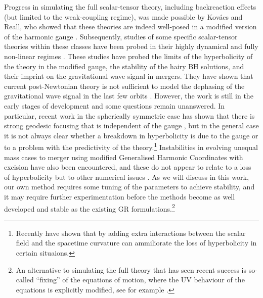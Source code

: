 \documentclass[reprint,aps,amsmath,amssymb,twoside,prd,showkeys,superscriptaddress,nofootinbib]{revtex4-2}
\begin{document}
Progress in simulating the full scalar-tensor theory, including backreaction effects (but limited to the weak-coupling regime), was made possible by Kov\'acs and Reall, who showed that these theories are indeed well-posed in a modified version of the harmonic gauge \cite{Kovacs:2020pns,Kovacs:2020ywu}. Subsequently, studies of some specific scalar-tensor theories within these classes have been probed in their highly dynamical and fully non-linear regimes \cite{East:2020hgw,East:2021bqk,East:2022rqi,Corman:2022xqg}. These studies have probed the limits of the hyperbolicity of the theory in the modified gauge, the stability of the hairy BH solutions, and their imprint on the gravitational wave signal in mergers. They have shown that current post-Newtonian theory is not sufficient to model the dephasing of the gravitational wave signal in the last few orbits \cite{Corman:2022xqg}. However, the work is still in the early stages of development and some questions remain unanswered. In particular, recent work in the spherically symmetric case has shown that there is strong geodesic focusing that is independent of the gauge \cite{R:2022hlf}, but in the general case it is not always clear whether a breakdown in hyperbolicity is due to the gauge or to a problem with the predictivity of the theory.\footnote{Recently \cite{Thaalba:2023fmq} have shown that by adding extra interactions between the scalar field and the spacetime curvature can ammiliorate the loss of hyperbolicity in certain situaions.} Instabilities in evolving unequal mass cases to merger using modified Generalised Harmonic Coordinates with excision have also been encountered, and these do not appear to relate to a loss of hyperbolicity but to other numerical issues \cite{Corman:2022xqg}. As we will discuss in this work, our own method requires some tuning of the parameters to achieve stability, and it may require further experimentation before the methods become as well developed and stable as the existing GR formulations.\footnote{An alternative to simulating the full theory that has seen recent success is so-called ``fixing'' of the equations of motion, where the UV behaviour of the equations is explicitly modified, see for example \cite{Cayuso:2023aht,Cayuso:2020lca,Franchini:2022ukz, Lara:2021piy,Bezares:2021yek,Cayuso:2017iqc}.}
\end{document}
